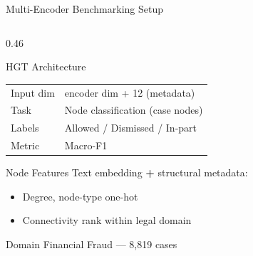 \documentclass[aspectratio=169, 9pt]{beamer}
\begin{document}
\begin{frame}{Multi-Encoder Benchmarking Setup}
\begin{columns}[T]
\begin{column}{0.46\textwidth}
\begin{block}{HGT Architecture}
\begin{tabular}{ll}
          Input dim  & encoder dim + 12 (metadata)\\
          Task       & Node classification (case nodes)\\
          Labels     & Allowed / Dismissed / In-part\\
          Metric     & Macro-F1\\
          \bottomrule
        \end{tabular}
      \end{block}
      \vspace{5pt}
      \begin{block}{Node Features}
        \small Text embedding \textbf{+} structural metadata:
        \begin{itemize}\scriptsize\setlength\itemsep{2pt}
          \item Degree, node-type one-hot
          \item Connectivity rank within legal domain
        \end{itemize}
      \end{block}
      \vspace{5pt}
      \begin{alertblock}{Domain}
        \small Financial Fraud — 8,819 cases
      \end{alertblock}
    \end{column}
  \end{columns}
\end{frame}
\end{document}
